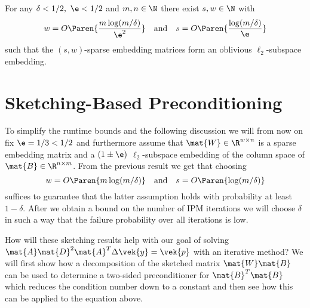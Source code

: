 \begin{theorem}\label{thm:sparse-ose}
For any \(\delta < 1/2, \ \e < 1/2\) and \(m, n \in \N\) there exist \(s, w \in \N\) with
\[ w = O \Paren{\frac{m \log(m/\delta)}{\e^2}} \quad \text{and} \quad s = O \Paren{\frac{\log(m/\delta)}{\e}} \]
such that the \((s, w)\)-sparse embedding matrices form an oblivious \(\ell_2\)-subspace embedding.
\end{theorem}

\section{Sketching-Based Preconditioning}\label{sec:sketching-preconditioning}

To simplify the runtime bounds and the following discussion we will from now on fix \(\e = 1/3 < 1/2\) and furthermore assume that \(\mat{W} \in \R^{w \times n}\) is a sparse embedding matrix and a \((1\pm\e)\) \(\ell_2\)-subspace embedding of the column space of \(\mat{B} \in \R^{n \times m}\).
From the previous result we get that choosing
\begin{equation} \label{eqn:sparse-ose-params}
  w = O \Paren{m \log(m/\delta)} \quad \text{and} \quad s = O \Paren{\log(m/\delta)}
\end{equation}
suffices to guarantee that the latter assumption holds with probability at least \(1 - \delta\).
After we obtain a bound on the number of IPM iterations we will choose \(\delta\) in such a way that the failure probability over all iterations is low.

How will these sketching results help with our goal of solving \(\mat{A} \mat{D}^2 \mat{A}^T \Delta\vek{y} = \vek{p}\) with an iterative method?
We will first show how a decomposition of the sketched matrix \(\mat{W}\mat{B}\) can be used to determine a two-sided preconditioner for \(\mat{B}^T \mat{B}\) which reduces the condition number down to a constant and then see how this can be applied to the equation above.

